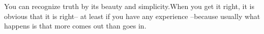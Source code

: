\documentclass[preview]{standalone}
\begin{document}
\begin{center}
You can recognize truth by its beauty and simplicity.When you get it right, it is obvious that it is right– at least if you have any experience –because usually what happens is that more comes out than goes in.
\end{center}
\end{document}
